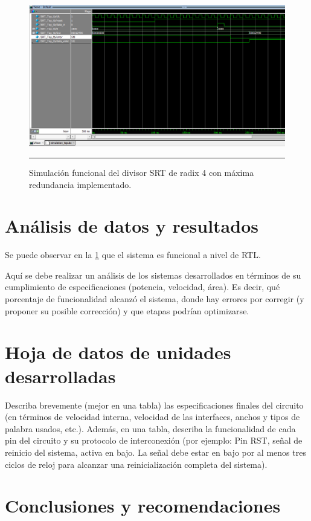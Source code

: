 \documentclass[12pt,a4paper]{article} %
\begin{document}
\begin{figure}[htbp]
  \centering
    \includegraphics[scale=0.7]{./Simulation.png}
    \rule{35em}{0.5pt}
  \caption[Sim]{Simulación funcional del divisor SRT de radix 4 con máxima redundancia implementado.}
  \label{fig:Sim}
\end{figure}

\section{Análisis de datos y resultados}

Se puede observar en la  \ref{fig:Sim}  que el sistema es funcional a nivel de RTL.

Aquí se debe realizar un análisis de los sistemas desarrollados en términos de su cumplimiento de especificaciones (potencia, velocidad, área). Es decir, qué porcentaje de funcionalidad alcanzó el sistema, donde hay errores por corregir (y proponer su posible corrección) y que etapas podrían optimizarse. 

\section{Hoja de datos de unidades desarrolladas}

Describa brevemente (mejor en una tabla) las especificaciones finales del circuito (en términos de velocidad interna, velocidad de las interfaces, anchos y tipos de palabra usados, etc.). Además, en una tabla, describa la funcionalidad de cada pin del circuito y su protocolo de interconexión (por ejemplo: Pin RST, señal de reinicio del sistema, activa en bajo. La señal debe estar en bajo por al menos tres ciclos de reloj para alcanzar una reinicialización completa del sistema).

\section{Conclusiones y recomendaciones}
\end{document}
